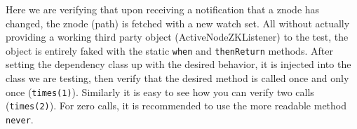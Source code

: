 Here we are verifying that upon receiving a notification that a znode has changed, the znode (path) is fetched with a new watch set.
All without actually providing a working third party object (ActiveNodeZKListener) to the test, the object is entirely faked with the static \texttt{when} and \texttt{thenReturn} methods. After setting the dependency class up with the desired behavior, it is injected into the class we are testing, then verify that the desired method is called once and only once (\texttt{times(1)}). Similarly it is easy to see how you can verify two calls (\texttt{times(2)}). For zero calls, it is recommended to use the more readable method \texttt{never}.
